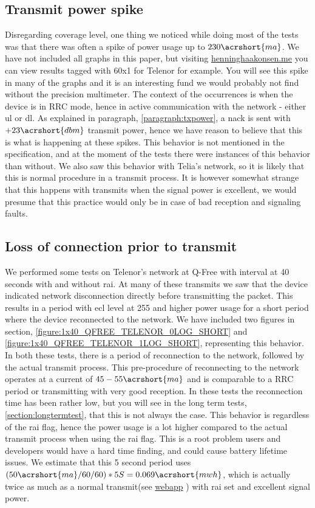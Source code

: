 \documentclass[USenglish]{ifimaster}  %
\begin{document}
\subsection{Transmit power spike}
Disregarding coverage level, one thing we noticed while doing most of the tests was that there was often a spike of power usage up to ${230 \acrshort{ma}}$. We have not included all graphs in this paper, but visiting \url{henninghaakonsen.me} you can view results tagged with 60x1 for Telenor for example. You will see this spike in many of the graphs and it is an interesting fund we would probably not find without the precision multimeter. The context of the occurrences is when the device is in RRC mode, hence in active communication with the network - either \acrshort{ul} or \acrshort{dl}. As explained in paragraph, \vref{paragraph:txpower}, a \acrshort{nack} is sent with ${+23 \acrshort{dbm}}$ transmit power, hence we have reason to believe that this is what is happening at these spikes. This behavior is not mentioned in the specification, and at the moment of the tests there were instances of this behavior than without. We also saw this behavior with Telia's network, so it is likely that this is normal procedure in a transmit process. It is however somewhat strange that this happens with transmits when the signal power is excellent, we would presume that this practice would only be in case of bad reception and signaling faults.

\subsection{Loss of connection prior to transmit} \label{ssection:ecl_255}
We performed some tests on Telenor's network at Q-Free with interval at 40 seconds with and without \acrshort{rai}. At many of these transmits we saw that the device indicated network disconnection directly before transmitting the packet. This results in a period with \acrshort{ecl} level at 255 and higher power usage for a short period where the device reconnected to the network. We have included two figures in section, \vref{figure:1x40_QFREE_TELENOR_0LOG_SHORT} and \vref{figure:1x40_QFREE_TELENOR_1LOG_SHORT}, representing this behavior. In both these tests, there is a period of reconnection to the network, followed by the actual transmit process. This pre-procedure of reconnecting to the network operates at a current of ${45-55 \acrshort{ma}}$ and is comparable to a RRC period or transmitting with very good reception.
In these tests the reconnection time has been rather low, but you will see in the long term tests, \vref{section:longtermtest}, that this is not always the case. This behavior is regardless of the \acrshort{rai} flag, hence the power usage is a lot higher compared to the actual transmit process when using the \acrshort{rai} flag. This is a root problem users and developers would have a hard time finding, and could cause battery lifetime issues. We estimate that this 5 second period uses ${(50 \acrshort{ma} / 60 / 60 ) * 5S = 0.069\acrshort{mwh}}$, which is actually twice as much as a normal transmit(see \href{http://158.39.77.97:9000/\#/results/Q-FREE_TELENOR_SHORT_TEST_2018-02-28_0_0x2_5_1_100}{webapp} \cite{online:result11}) with \acrshort{rai} set and excellent signal power.
\end{document}

